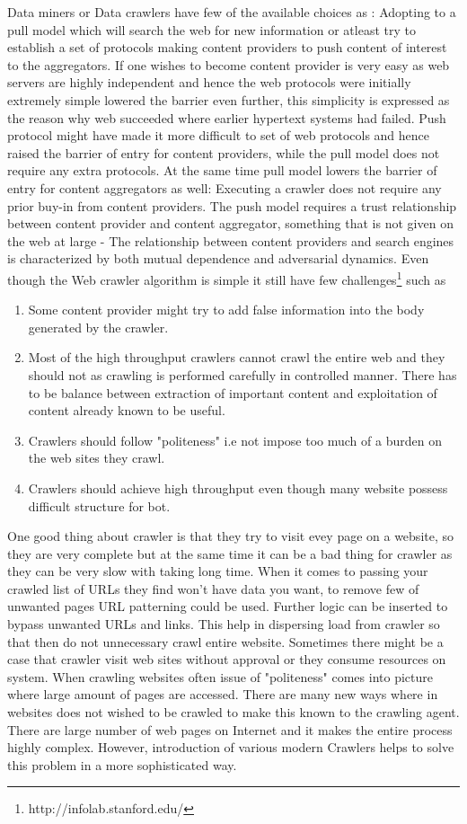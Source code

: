 \documentclass[article,type=msc,colorback,accentcolor=tud9c,twoside,11pt]{tudthesis}
\begin{document}
Data miners or Data crawlers have few of the available choices as : Adopting to a pull model which will search the web for new information or atleast try to establish a set of protocols making content providers to push content of interest to the aggregators. If one wishes to become content provider is very easy as web servers are highly independent and hence the web protocols were initially extremely simple lowered the barrier even further, this simplicity is expressed as the reason why web succeeded where earlier hypertext systems had failed. Push protocol might have made it more difficult to set of web protocols and hence raised the barrier of entry for content providers, while the pull model does not require any extra protocols. At the same time pull model lowers the barrier of entry for content aggregators as well: Executing a crawler does not require any prior buy-in from content providers. The push model requires a trust relationship between content provider and content aggregator, something that is not given on the web at large - The relationship between content providers and search engines is characterized by both mutual dependence and adversarial dynamics.
Even though the Web crawler algorithm is simple it still have few challenges\footnote{http://infolab.stanford.edu/} such as
\begin{enumerate}
\item Some content provider might try to add false information into the body generated by the crawler.
\item Most of the high throughput crawlers cannot crawl the entire web and they should not as crawling is performed carefully in controlled manner. There has to be balance between extraction of important content and exploitation of content already known to be useful.
\item Crawlers should follow "politeness" i.e not impose too much of a burden on the web sites they crawl.
\item Crawlers should achieve high throughput even though many website possess difficult structure for bot.
\end{enumerate}

One good thing about crawler is that they try to visit evey page on a website, so they are very complete but at the same time it can be a bad thing for crawler as they can be very slow with taking long time. When it comes to passing your crawled list of URLs they find won't have data you want, to remove few of unwanted pages URL patterning could be used. Further logic can be inserted to bypass unwanted URLs and links. This help in dispersing load from crawler so that then do not unnecessary crawl entire website. Sometimes there might be a case that crawler visit web sites without approval or they consume resources on system. When crawling websites often issue of "politeness" comes into picture where large amount of pages are accessed. There are many new ways where in websites does not wished to be crawled to make this known to the crawling agent. There are large number of web pages on Internet and it makes the entire process highly complex. However, introduction of various modern Crawlers helps to solve this problem in a more sophisticated way. 
\end{document}
